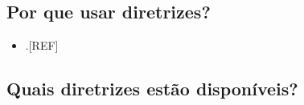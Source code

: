 \documentclass[
]{book}
\providecommand{\tightlist}{%
  \setlength{\itemsep}{0pt}\setlength{\parskip}{0pt}}
\begin{document}
\hypertarget{por-que-usar-diretrizes}{%
\subsection{Por que usar diretrizes?}\label{por-que-usar-diretrizes}}

\begin{itemize}
\tightlist
\item
  .{[}REF{]}
\end{itemize}

\hypertarget{quais-diretrizes-estuxe3o-disponuxedveis}{%
\subsection{Quais diretrizes estão disponíveis?}\label{quais-diretrizes-estuxe3o-disponuxedveis}}
\end{document}
